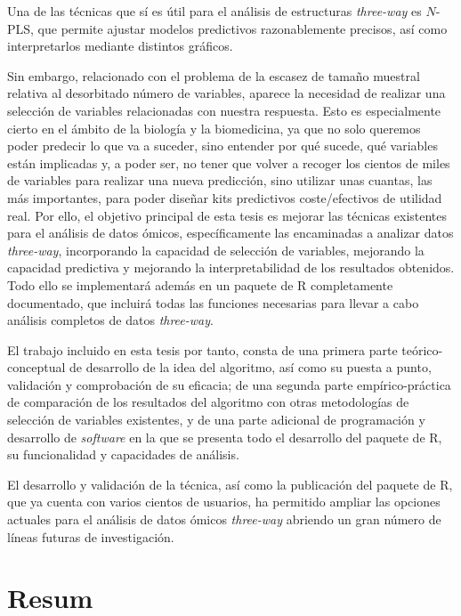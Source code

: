 Una de las técnicas que sí es útil para el análisis de estructuras \textit{three-way} es $N$-PLS, que permite ajustar modelos predictivos razonablemente precisos, así como interpretarlos mediante distintos gráficos.

Sin embargo, relacionado con el problema de la escasez de tamaño muestral relativa al desorbitado número de variables, aparece la necesidad de realizar una selección de variables relacionadas con nuestra respuesta. Esto es especialmente cierto en el ámbito de la biología y la biomedicina, ya que no solo queremos poder predecir lo que va a suceder, sino entender por qué sucede, qué variables están implicadas y, a poder ser, no tener que volver a recoger los cientos de miles de variables para realizar una nueva predicción, sino utilizar unas cuantas, las más importantes, para poder diseñar kits predictivos coste/efectivos de utilidad real. Por ello, el objetivo principal de esta tesis es mejorar las técnicas existentes para el análisis de datos ómicos, específicamente las encaminadas a analizar datos \textit{three-way}, incorporando la capacidad de selección de variables, mejorando la capacidad predictiva y mejorando la interpretabilidad de los resultados obtenidos. Todo ello se implementará además en un paquete de R completamente documentado, que incluirá todas las funciones necesarias para llevar a cabo análisis completos de datos \textit{three-way}. 

El trabajo incluido en esta tesis por tanto, consta de una primera parte teórico-conceptual de desarrollo de la idea del algoritmo, así como su puesta a punto, validación y comprobación de su eficacia; de una segunda parte empírico-práctica de comparación de los resultados del algoritmo con otras metodologías de selección de variables existentes, y de una parte adicional de programación y desarrollo de \textit{software} en la que se presenta todo el desarrollo del paquete de R, su funcionalidad y capacidades de análisis. 

El desarrollo y validación de la técnica, así como la publicación del paquete de R, que ya cuenta con varios cientos de usuarios, ha permitido ampliar las opciones actuales para el análisis de datos ómicos \textit{three-way}  abriendo un gran número de líneas futuras de investigación.


\ifEBOOKPDF
	\bigskip
\else
	\vfill
\fi


\chapter*{Resum}

